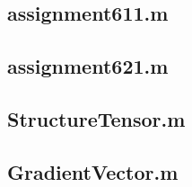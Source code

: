 \documentclass[a4paper, 10pt, final]{article}
\begin{document}
\subsection{assignment611.m}


\subsection{assignment621.m}


\subsection{StructureTensor.m}


\subsection{GradientVector.m}

\end{document}
